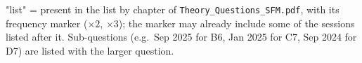 {\footnotesize "list" = present in the list by chapter of \texttt{Theory\_Questions\_SFM.pdf}, with its frequency marker
($\times2$, $\times3$); the marker may already include some of the sessions listed after it. Sub-questions (e.g.\ Sep 2025 for B6,
Jan 2025 for C7, Sep 2024 for D7) are listed with the larger question.}
